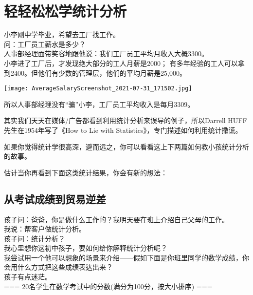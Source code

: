 

\chapter{轻轻松松学统计分析} %


小李刚中学毕业，希望去工厂找工作。\\
问：工厂员工薪水是多少？\\
人事部经理面带笑容地跟他说：我们工厂员工平均月收入大概3300。\\
小李进了工厂后，才发现绝大部分的工人月薪是2000；
有多年经验的工人可以拿到2400。但他们有少数的管理层，他们的平均月薪是25,000。



\texttt{[image: AverageSalaryScreenshot\_2021-07-31\_171502.jpg]}

所以人事部经理没有``骗''小李，工厂员工平均收入是每月3309。

其实我们天天在媒体/广告都看到利用统计分析来误导的例子，所以Darrell HUFF
先生在1954年写了《How to Lie with
Statistics》，专门描述如何利用统计撒谎。

如果你觉得统计学很高深，避而远之，你可以看看这上下两篇如何教小孩统计分析的故事。

估计当你再看到下面这类统计结果，你会有新的想法：


\hypertarget{ux4eceux8003ux8bd5ux6210ux7ee9ux5230ux8d38ux6613ux9006ux5dee}{%
\section{从考试成绩到贸易逆差}\label{ux4eceux8003ux8bd5ux6210ux7ee9ux5230ux8d38ux6613ux9006ux5dee}}

孩子问：爸爸，你是做什么工作的？我明天要在班上介绍自己父母的工作。\\
我说：帮客户做统计分析。\\
孩子问：统计分析？\\
我心里想你这初中孩子，要如何给你解释统计分析呢？\\
我尝试用一个他可以想象的场景来介绍------假如下面是你班里同学的数学成绩，你会用什么方式把这些成绩表达出来？\\
孩子有点迷茫。\\
=== 20名学生在数学考试中的分数(满分为100分，按大小排序) ===

